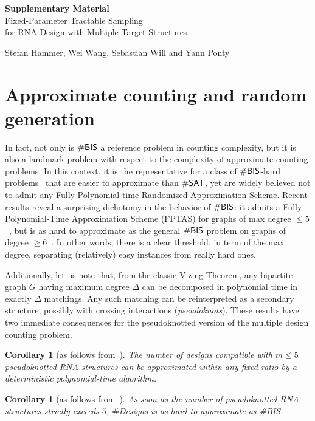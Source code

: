 \documentclass[10pt]{article}
\newtheorem{corollary}[theorem]{Corollary}
\newcommand{\Def}[1]{\emph{#1}}
\newcommand{\NumDesign}{\ensuremath{\#}{\sf Designs}\xspace}
\newcommand{\citep}[1]{\cite{#1}}
\begin{document}
\onecolumn

\appendix
{\centering \Large \textbf{Supplementary Material}\\[1em] Fixed-Parameter Tractable Sampling\\ for RNA Design with Multiple Target Structures\\%
}

\medskip
\begin{center}
\large Stefan Hammer, Wei Wang, Sebastian Will and Yann Ponty
\end{center}
\section{Approximate counting and random generation}
In fact, not only is $\#{\sf BIS}$ a reference problem in counting complexity, but it is also a landmark problem with respect to the complexity of approximate counting problems. In this context, it is the representative for a class of $\#{\sf BIS}$-hard problems~\citep{Bulatov2013} that are easier to approximate than $\# {\sf SAT}$, yet are widely believed not to admit any Fully Polynomial-time Randomized Approximation Scheme. Recent results reveal a surprising dichotomy in the behavior of $\#{\sf BIS}$: it admits a Fully Polynomial-Time Approximation Scheme (FPTAS) for graphs of max degree $\le 5$~\citep{Weitz2006}, but is as hard to approximate as the general $\#{\sf BIS}$ problem on graphs of degree $\ge 6$~\citep{Cai2016}. In other words, there is a clear threshold, in term of the max degree, separating (relatively) easy instances from really hard ones.

Additionally, let us note that, from the classic Vizing Theorem, any bipartite graph $G$ having maximum degree $\Delta$ can be decomposed in polynomial time in exactly $\Delta$ matchings. Any such matching can be reinterpreted as a secondary structure, possibly with crossing interactions (\Def{pseudoknots}). These results have two immediate consequences for the pseudoknotted version of the multiple design counting problem.
\begin{corollary}[as follows from~\citep{Weitz2006}]The number of designs compatible with $m\le 5$ pseudoknotted RNA structures can be approximated within any fixed ratio by a deterministic polynomial-time algorithm.
\end{corollary}
\begin{corollary}[as follows from~\citep{Cai2016}]
  As soon as the number of pseudoknotted RNA structures strictly exceeds $5$, \NumDesign is as hard to approximate as {\#{\sf BIS}}.
\end{corollary}
\end{document}
